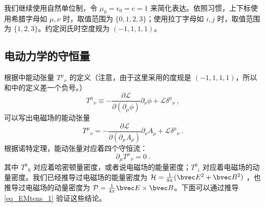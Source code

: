 

我们继续使用自然单位制，令 $\mu_0=\epsilon_0=c=1$ 来简化表达。依照习惯，上下标使用希腊字母如 $\mu, \nu$ 时，取值范围为 $\{0, 1, 2, 3\}$；使用拉丁字母如 $i, j$ 时，取值范围为 $\{1, 2, 3\}$。约定闵氏时空度规为 $(-1,1,1,1)$。

\subsection{电动力学的守恒量}
根据中能动张量 ${T^\mu}_\nu$ 的定义（注意，由于这里采用的度规是 $(-1,1,1,1)$，所以和中的定义差一个负号。）
\begin{equation}
T^\mu{}_\nu \equiv -\frac{\partial \mathcal L}{\partial (\partial_\mu \phi)} \partial_\nu \phi + \mathcal L \delta^\mu{}_\nu~,
\end{equation}
可以写出电磁场的能动张量
\begin{equation}\label{eq_EMtens_1}
T^\mu{}_\nu =-\frac{\partial \mathcal L}{\partial (\partial_\mu A_\rho)} \partial_\nu A_\rho + \mathcal L \delta^\mu{}_\nu~.
\end{equation}
根据诺特定理，能动张量对应着四个守恒流：
\begin{equation}
\partial_\mu T^\mu{}_\nu=0~.
\end{equation}
其中 $T^0{}_0$ 对应着哈密顿量密度，或者说电磁场的能量密度；$T^0{}_i$ 对应着电磁场的动量密度。我们已经推导过电磁场的能量密度为 $\mathcal H=\frac{1}{8\pi}(\bvec E^2+\bvec B^2)$ ，也推导过电磁场的动量密度为 $\mathcal P=\frac{1}{4\pi} \bvec E\times \bvec B$。下面可以通过推导 \autoref{eq_EMtens_1} 验证这些结论。

